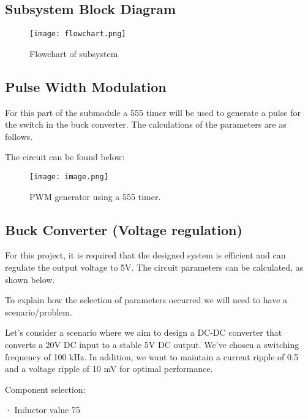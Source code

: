 \documentclass[class=report,11pt,crop=false]{standalone}
\begin{document}
\subsection{Subsystem Block Diagram}

 \begin{figure}
     \centering
     \texttt{[image: flowchart.png]}
     \caption{Flowchart of subsystem}
     \label{fig:enter-label}
 \end{figure}

\subsection{Pulse Width Modulation}

For this part of the submodule a 555 timer will be used to generate a pulse for the switch in the buck converter. The calculations of the parameters are as follows.

The circuit can be found below:
\begin{figure}
    \centering
    \texttt{[image: image.png]}
    \caption{PWM generator using a 555 timer.}
    \label{fig:enter-label}
\end{figure}


\subsection{Buck Converter (Voltage regulation)}

For this project, it is required that the designed system is efficient and can regulate the output voltage to 5V. The circuit parameters can be calculated, as shown below.

To explain how the selection of parameters occurred we will need to have a scenario/problem. 

Let's consider a scenario where we aim to design a DC-DC converter that converts a 20V DC input to a stable 5V DC output. We've chosen a switching frequency of 100 kHz. In addition, we want to maintain a current ripple of 0.5 and a voltage ripple of 10 mV for optimal performance.

 

 

 

 

 

 

 Component selection:

· Inductor value 75 
\end{document}
